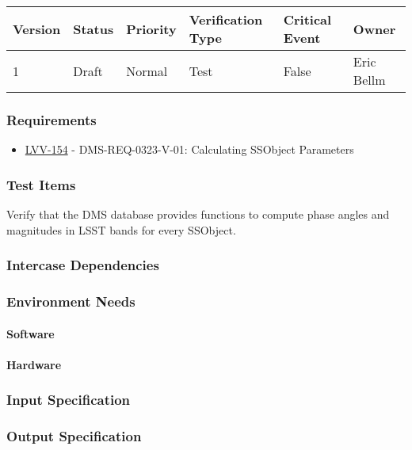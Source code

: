 \begin{longtable}[]{llllll}
\toprule
Version & Status & Priority & Verification Type & Critical Event & Owner
\\\midrule
1 & Draft & Normal &
Test & False & Eric Bellm
\\\bottomrule
\end{longtable}

\subsubsection{Requirements}
\begin{itemize}
\item \href{https://jira.lsstcorp.org/browse/LVV-154}{LVV-154} - DMS-REQ-0323-V-01: Calculating SSObject Parameters
\end{itemize}

\subsubsection{Test Items}
Verify that the DMS database provides functions to compute phase angles
and magnitudes in LSST bands for every SSObject.



\subsubsection{Intercase Dependencies}

\subsubsection{Environment Needs}

\paragraph{Software}

\paragraph{Hardware}

\subsubsection{Input Specification}

\subsubsection{Output Specification}

